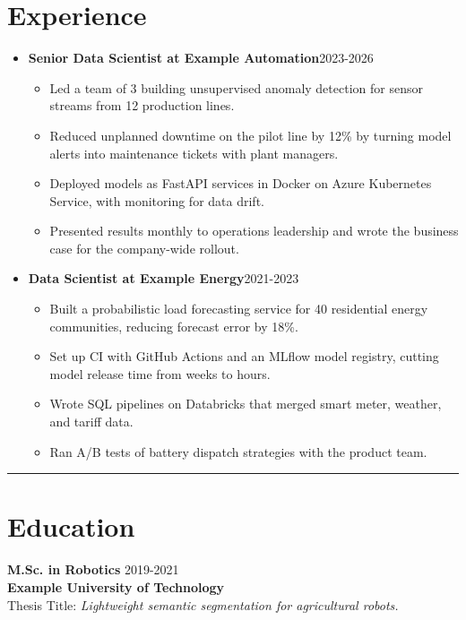 \section*{Experience}
\begin{itemize}[leftmargin=*]
    \item \textbf{Senior Data Scientist at Example Automation}\hfill 2023-2026
    \begin{itemize}
        \item Led a team of 3 building unsupervised anomaly detection for sensor streams from 12 production lines.
        \item Reduced unplanned downtime on the pilot line by 12\% by turning model alerts into maintenance tickets with plant managers.
        \item Deployed models as FastAPI services in Docker on Azure Kubernetes Service, with monitoring for data drift.
        \item Presented results monthly to operations leadership and wrote the business case for the company-wide rollout.
    \end{itemize}
    \item \textbf{Data Scientist at Example Energy}\hfill 2021-2023
    \begin{itemize}
        \item Built a probabilistic load forecasting service for 40 residential energy communities, reducing forecast error by 18\%.
        \item Set up CI with GitHub Actions and an MLflow model registry, cutting model release time from weeks to hours.
        \item Wrote SQL pipelines on Databricks that merged smart meter, weather, and tariff data.
        \item Ran A/B tests of battery dispatch strategies with the product team.
    \end{itemize}
\end{itemize}
\vspace{0.5\baselineskip}\hrule\vspace{0.5\baselineskip}

\section*{Education}
\noindent \textbf{M.Sc. in Robotics} \hfill 2019-2021\\
\textbf{Example University of Technology}\\
Thesis Title: \textit{Lightweight semantic segmentation for agricultural robots.}\\

